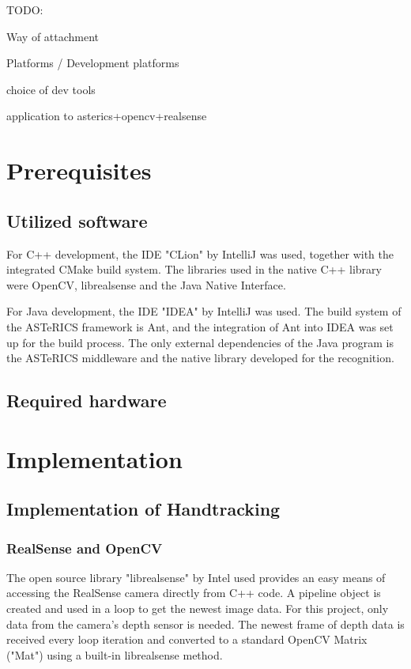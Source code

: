 \documentclass[BSA,Bachelor,english]{twbook}%
\begin{document}
TODO:

Way of attachment

Platforms / Development platforms

choice of dev tools

application to asterics+opencv+realsense

\section{Prerequisites}
\subsection{Utilized software}
For C++ development, the IDE "CLion" by IntelliJ was used, together with the integrated CMake build system. The libraries used in the native C++ library were OpenCV, librealsense and the Java Native Interface.

For Java development, the IDE "IDEA" by IntelliJ was used. The build system of the ASTeRICS framework is Ant, and the integration of Ant into IDEA was set up for the build process. The only external dependencies of the Java program is the ASTeRICS middleware and the native library developed for the recognition.
\subsection{Required hardware}

\section{Implementation}
\subsection{Implementation of Handtracking}
\subsubsection{RealSense and OpenCV}
The open source library "librealsense" by Intel used provides an easy means of accessing the RealSense camera directly from C++ code. A pipeline object is created and used in a loop to get the newest image data. For this project, only data from the camera's depth sensor is needed. The newest frame of depth data is received every loop iteration and converted to a standard OpenCV Matrix ("Mat") using a built-in librealsense method.
\end{document}
